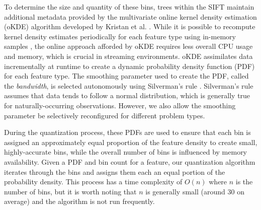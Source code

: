 To determine the size and quantity of these bins, trees within the SIFT maintain additional metadata provided by the multivariate online kernel density estimation (oKDE) algorithm developed by Kristan et al. \cite{kristan2011multivariate}. While it is possible to recompute kernel density estimates periodically for each feature type using in-memory samples \cite{malensek2013autonomously}, the online approach afforded by oKDE requires less overall CPU usage and memory, which is crucial in streaming environments.  oKDE assimilates data incrementally at runtime to create a dynamic probability density function (PDF) for each feature type. The smoothing parameter used to create the PDF, called the \emph{bandwidth}, is selected autonomously using Silverman's rule \cite{silverman1986density}. Silverman's rule assumes that data tends to follow a normal distribution, which is generally true for naturally-occurring observations. However, we also allow the smoothing parameter be selectively reconfigured for different problem types.

During the quantization process, these PDFs are used to ensure that each bin is assigned an approximately equal proportion of the feature density to create small, highly-accurate bins, while the overall number of bins is influenced by memory availability. Given a PDF and bin count for a feature, our quantization algorithm iterates through the bins and assigns them each an equal portion of the probability density. This process has a time complexity of $O(n)$ where $n$ is the number of bins, but it is worth noting that $n$ is generally small (around 30 on average) and the algorithm is not run frequently.

